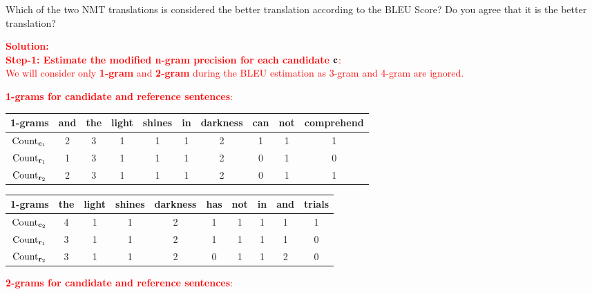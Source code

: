 \begin{parts}
\begin{subparts}
        Which of the two NMT translations is considered the better translation according to the BLEU Score? Do you agree that it is the better translation?

\textcolor{red}{\textbf{Solution: }\\
\textbf{Step-1: Estimate the modified n-gram precision for each candidate} $\mathbf{c}$:\\
We will consider only \textbf{1-gram} and \textbf{2-gram} during the BLEU estimation as 3-gram and 4-gram are ignored.}


\textcolor{red}{\textbf{1-grams for candidate and reference sentences}:}

\begin{table}[h!]
\centering
{\color{red}\begin{tabular}{|c|c|c|c|c|c|c|c|c|c|} 
 \hline
 \textbf{1-grams} & and & the & light & shines & in & darkness & can & not & comprehend \\ [0.5ex] 
 \hline
 $\text{Count}_{\mathbf{c}_1}$ & 2 & 3 & 1 & 1 & 1 & 2 & 1 & 1 & 1\\  
 $\text{Count}_{\mathbf{r}_1}$ & 1 & 3 & 1 & 1 & 1 & 2 & 0 & 1 & 0\\
 $\text{Count}_{\mathbf{r}_2}$ & 2 & 3 & 1 & 1 & 1 & 2 & 0 & 1 & 1 \\ [1ex] 
 \hline
\end{tabular}}
\label{table:1}
\end{table}

\begin{table}[h!]
\centering
{\color{red}\begin{tabular}{|c|c|c|c|c|c|c|c|c|c|} 
 \hline
 \textbf{1-grams} & the & light & shines & darkness & has & not & in & and & trials \\ [0.5ex] 
 \hline
 $\text{Count}_{\mathbf{c}_2}$ & 4 & 1 & 1 & 2 & 1 & 1 & 1 & 1 & 1\\ 
 $\text{Count}_{\mathbf{r}_1}$ & 3 & 1 & 1 & 2 & 1 & 1 & 1 & 1 & 0 \\
 $\text{Count}_{\mathbf{r}_2}$ & 3 & 1 & 1 & 2 & 0 & 1 & 1 & 2 & 0 \\ [1ex] 
 \hline
\end{tabular}}
\label{table:1}
\end{table}

\textcolor{red}{\textbf{2-grams for candidate and reference sentences}:}


\end{subparts}
\end{parts}
